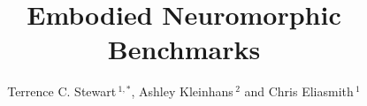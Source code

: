 \documentclass{frontiersSCNS} %
\def\firstAuthorLast{Stewart {et~al.}} %
\def\Authors{Terrence C. Stewart\,$^{1,*}$, Ashley Kleinhans\,$^{2}$ and Chris Eliasmith\,$^1$}
\begin{document}
\onecolumn
{}

\title[Embodied Neuromorphic Benchmarks]{Embodied Neuromorphic Benchmarks} 

\author[\firstAuthorLast ]{\Authors} %
\address{} %
\correspondance{} %

\extraAuth{}%

\maketitle

\end{document}
